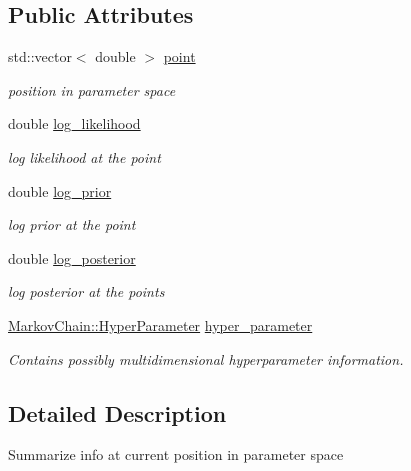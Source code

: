 \subsection*{Public Attributes}
\begin{DoxyCompactItemize}
\item 
std::vector$<$ double $>$ \hyperlink{structeos_1_1MarkovChain_1_1State_a13518a1ded09d2c61dbfc2cc40297b94}{point}
\begin{DoxyCompactList}\small\item\em position in parameter space \item\end{DoxyCompactList}\item 
double \hyperlink{structeos_1_1MarkovChain_1_1State_a0876fac286eb6eb52165389cfcc9e602}{log\_\-likelihood}
\begin{DoxyCompactList}\small\item\em log likelihood at the point \item\end{DoxyCompactList}\item 
double \hyperlink{structeos_1_1MarkovChain_1_1State_a4fa9205eb7785b52cc97f13714a3f62b}{log\_\-prior}
\begin{DoxyCompactList}\small\item\em log prior at the point \item\end{DoxyCompactList}\item 
double \hyperlink{structeos_1_1MarkovChain_1_1State_a893de1735354ecbfa51b34655fb28833}{log\_\-posterior}
\begin{DoxyCompactList}\small\item\em log posterior at the points \item\end{DoxyCompactList}\item 
\hyperlink{structeos_1_1MarkovChain_1_1HyperParameter}{MarkovChain::HyperParameter} \hyperlink{structeos_1_1MarkovChain_1_1State_a23f1f4c2b99c7b8956409f5f645d0337}{hyper\_\-parameter}
\begin{DoxyCompactList}\small\item\em Contains possibly multidimensional hyperparameter information. \item\end{DoxyCompactList}\end{DoxyCompactItemize}


\subsection{Detailed Description}
Summarize info at current position in parameter space 

